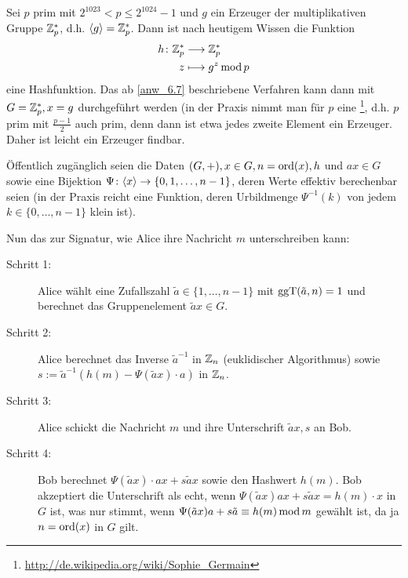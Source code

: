 \begin{bsp}
	Sei $p$ prim mit $2^{1023} < p \leq 2^{1024} - 1$ und $g$ ein Erzeuger der multiplikativen Gruppe $\mathbb{Z}_p^*$, d.h. $\langle g\rangle = \mathbb{Z}_p^*$. Dann ist nach heutigem Wissen die Funktion
	\begin{equation}
	\begin{aligned}
		h\colon \mathbb{Z}_p^* &\longrightarrow \mathbb{Z}_p^* \\
		z &\longmapsto g^z \operatorname{mod} p
	\end{aligned}
	\end{equation}
	eine Hashfunktion. Das ab \ref{anw_6.7} beschriebene Verfahren kann dann mit $G = \mathbb{Z}_p^*, x = g$ durchgeführt werden (in der Praxis nimmt man für $p$ eine \footnote{\url{http://de.wikipedia.org/wiki/Sophie_Germain}}, d.h. $p$ prim mit $\frac{p-1}{2}$ auch prim, denn dann ist etwa jedes zweite Element ein Erzeuger. Daher ist leicht ein Erzeuger findbar.
\end{bsp}

\begin{bem}
	Öffentlich zugänglich seien die Daten $(G,+), x \in G, n = \operatorname{ord}(x), h$ und $ax \in G$ sowie eine Bijektion $\Psi\colon \langle x\rangle \rightarrow \{0,1,\dots,n-1\}$, deren Werte effektiv berechenbar seien (in der Praxis reicht eine Funktion, deren Urbildmenge $\Psi^{-1}(k)$ von jedem $k \in \{0,\dots,n-1\}$ klein ist).
\end{bem}

\begin{anw}
	Nun das  zur Signatur, wie Alice ihre Nachricht $m$ unterschreiben kann:
	\begin{description}
		\item[Schritt 1:] Alice wählt eine Zufallszahl $\tilde{a} \in \{1,\dots,n-1\}$ mit $\operatorname{ggT}(\tilde{a},n) = 1$ und berechnet das Gruppenelement $\tilde{a}x \in G$.
		\item[Schritt 2:] Alice berechnet das Inverse $\tilde{a}^{-1}$ in $\mathbb{Z}_n$ (euklidischer Algorithmus) sowie $s := \tilde{a}^{-1} (h(m)-\Psi(\tilde{a}x)\cdot a)$ in $\mathbb{Z}_n$.
		\item[Schritt 3:] Alice schickt die Nachricht $m$ und ihre Unterschrift $\tilde{a}x,s$ an Bob.
		\item[Schritt 4:] Bob berechnet $\Psi(\tilde{a}x) \cdot ax + s \tilde{a}x$ sowie den Hashwert $h(m)$. Bob akzeptiert die Unterschrift als echt, wenn $\Psi(\tilde{a}x) ax + s \tilde{a}x = h(m) \cdot x$ in $G$ ist, was nur stimmt, wenn $\Psi(\tilde{a}x)a + s\tilde{a} \equiv h(m) \operatorname{mod} m$ gewählt ist, da ja $n = \operatorname{ord}(x)$ in $G$ gilt.
	\end{description}
\end{anw}

